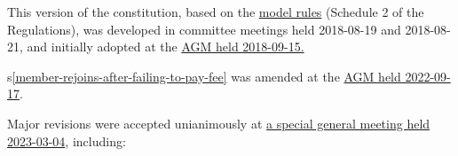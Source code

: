 \documentclass[../constitution.tex]{subfiles}
\begin{document}

This version of the constitution, based on the \href{https://www.commerce.wa.gov.au/consumer-protection/model-rules}{model rules} (Schedule 2 of the Regulations), was developed in committee meetings held 2018-08-19 and 2018-08-21, and initially adopted at the \href{https://wiki.artifactory.org.au/en/minutes/AGM/2018-09-15}{AGM held 2018-09-15.}

s\ref{member-rejoins-after-failing-to-pay-fee} was amended at the \href{https://wiki.artifactory.org.au/en/minutes/AGM/2022-09-17}{AGM held 2022-09-17}.

Major revisions were accepted unianimously at \href{https://wiki.artifactory.org.au/en/minutes/SGM/2022-03-04}{a special general meeting held 2023-03-04}, including:
\end{document}
